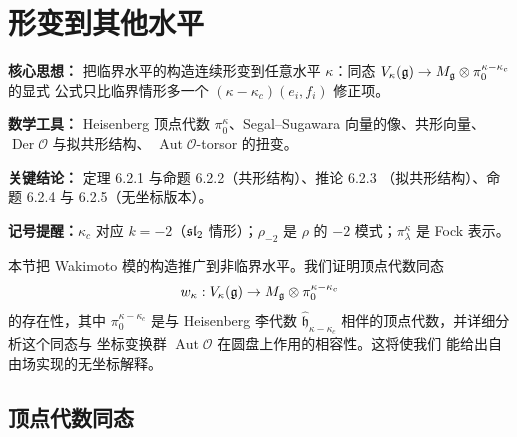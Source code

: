 \section{形变到其他水平}

\setcounter{theorem}{0}

\begin{keypoints}
    \item \textbf{核心思想：} 把临界水平的构造连续形变到任意水平 $\kappa$：同态
    $V_\kappa(\mathfrak{g})\to M_{\mathfrak g}\otimes\pi_0^{\kappa-\kappa_c}$ 的显式
    公式只比临界情形多一个 $(\kappa-\kappa_c)(e_i,f_i)$ 修正项。
    \item \textbf{数学工具：} Heisenberg 顶点代数 $\pi_0^\kappa$、Segal--Sugawara
    向量的像、共形向量、$\operatorname{Der}\mathcal O$ 与拟共形结构、
    $\operatorname{Aut}\mathcal O$-torsor 的扭变。
    \item \textbf{关键结论：} 定理 6.2.1 与命题 6.2.2（共形结构）、推论 6.2.3
    （拟共形结构）、命题 6.2.4 与 6.2.5（无坐标版本）。
    \item \textbf{记号提醒：}$\kappa_c$ 对应 $k=-2$（$\mathfrak{sl}_2$ 情形）；$\rho_{-2}$
    是 $\rho$ 的 $-2$ 模式；$\pi^\kappa_\lambda$ 是 Fock 表示。
\end{keypoints}

本节把 Wakimoto 模的构造推广到非临界水平。我们证明顶点代数同态
\[
    w_\kappa:V_\kappa(\mathfrak{g})\to M_{\mathfrak g}\otimes\pi_0^{\kappa-\kappa_c}
\]
的存在性，其中 $\pi_0^{\kappa-\kappa_c}$ 是与 Heisenberg 李代数
$\widehat{\mathfrak h}_{\kappa-\kappa_c}$ 相伴的顶点代数，并详细分析这个同态与
坐标变换群 $\operatorname{Aut}\mathcal O$ 在圆盘上作用的相容性。这将使我们
能给出自由场实现的无坐标解释。

\subsection{顶点代数同态}

